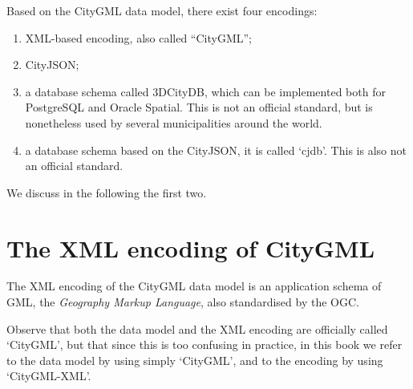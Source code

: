 Based on the CityGML data model, there exist four encodings:
\begin{enumerate}
  \item XML-based encoding, also called ``CityGML'';
  \item CityJSON;
  \item a database schema called 3DCityDB, which can be implemented both for PostgreSQL and Oracle Spatial. This is not an official standard, but is nonetheless used by several municipalities around the world.
  \item a database schema based on the CityJSON, it is called `cjdb'. This is also not an official standard.
\end{enumerate}
We discuss in the following the first two.


\section[XML-encoded CityGML]{The XML encoding of CityGML}%
\label{sec:citygmlxml}

The XML encoding of the CityGML data model is an application schema of GML, the \emph{Geography Markup Language}, also standardised by the OGC.

Observe that both the data model and the XML encoding are officially called `CityGML', but that since this is too confusing in practice, in this book we refer to the data model by using simply `CityGML', and to the encoding by using `CityGML-XML'.


%

